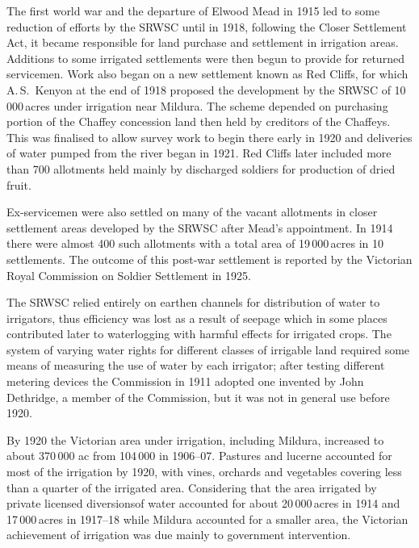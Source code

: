 The first world war and the departure of Elwood Mead 
in 1915 led to some reduction of efforts by the SRWSC until in 1918,
following the Closer Settlement Act, it became responsible for land
purchase and settlement in irrigation areas.  Additions to some
irrigated settlements were then begun to provide for returned
servicemen.  Work also began on a new settlement known as Red Cliffs,
 for which A.\,S.~Kenyon 
 at the end of 1918 proposed the development by the SRWSC of
10\,000\,acres under irrigation near Mildura.  The scheme depended on
purchasing portion of the Chaffey concession land then held by
creditors of the Chaffeys.  This was finalised to allow survey work to
begin there early in 1920 and deliveries of water pumped from the
river began in 1921.  Red Cliffs later included more than 700
allotments held mainly by discharged soldiers for production of dried
fruit.

Ex-servicemen were also settled on many of the vacant allotments in
closer settlement areas developed by the SRWSC after Mead's
appointment.  In 1914 there were almost 400 such allotments with a
total area of 19\,000\,acres in 10 settlements. The outcome of this
post-war settlement is reported by the Victorian Royal Commission on
Soldier Settlement in 1925.

The SRWSC relied entirely on earthen channels for distribution of
water to irrigators, thus efficiency was lost as a result of seepage
which in some places contributed later to waterlogging
 with harmful
effects for irrigated crops.  The system of varying water rights for
different classes of irrigable land required some means of measuring
the use of water by each irrigator; after testing different metering
devices the Commission in 1911 adopted one invented by John Dethridge,
a member of the Commission, but it was not in general use before
1920.

By 1920 the Victorian area under irrigation, including Mildura,
increased to about 370\,000 ac from 104\,000 in 1906--07.  Pastures
and luc\-er\-ne accounted for most of the irrigation by 1920, with
vines, orchards and vegetables covering less than a quarter of the
irrigated area. Considering that the area irrigated by private
licensed diversionsof water accounted for about 20\,000\,acres in 1914
and 17\,000\,acres in 1917--18 while Mildura accounted for a smaller
area, the Victorian achievement of irrigation was due mainly to
government intervention.

